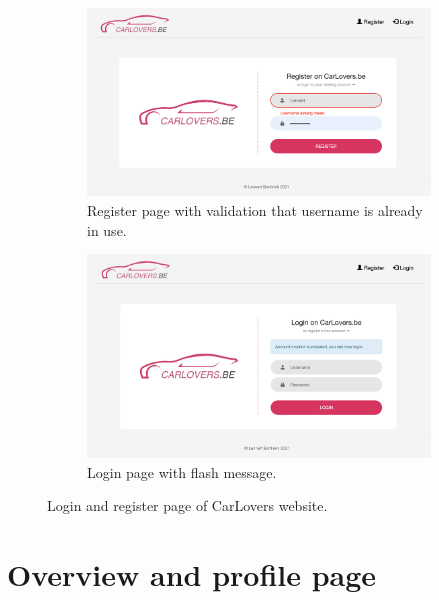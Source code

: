 \begin{figure}[H]
     \centering
     \begin{subfigure}[b]{0.9\textwidth}
         \centering
         \includegraphics[width=\textwidth]{images/register.png}
         \caption{Register page with validation that username is already in use.}
         \label{fig:register}
     \end{subfigure}
     \hfill
     \begin{subfigure}[b]{0.9\textwidth}
         \centering
         \includegraphics[width=\textwidth]{images/login.png}
         \caption{Login page with flash message.}
         \label{fig:login}
     \end{subfigure}
        \caption{Login and register page of CarLovers website.}
        \label{fig:login_register}
\end{figure}


\section*{Overview and profile page}

